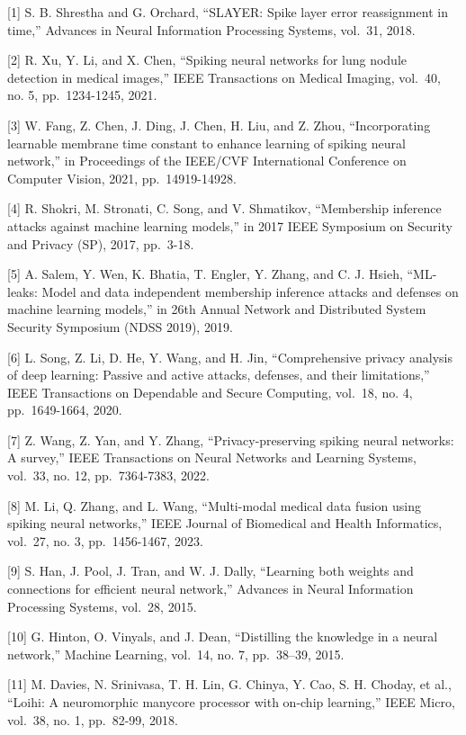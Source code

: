 \documentclass[
]{article}
\begin{document}
{[}1{]} S. B. Shrestha and G. Orchard, ``SLAYER: Spike layer error
reassignment in time,'' Advances in Neural Information Processing
Systems, vol.~31, 2018.

{[}2{]} R. Xu, Y. Li, and X. Chen, ``Spiking neural networks for lung
nodule detection in medical images,'' IEEE Transactions on Medical
Imaging, vol.~40, no. 5, pp.~1234-1245, 2021.

{[}3{]} W. Fang, Z. Chen, J. Ding, J. Chen, H. Liu, and Z. Zhou,
``Incorporating learnable membrane time constant to enhance learning of
spiking neural network,'' in Proceedings of the IEEE/CVF International
Conference on Computer Vision, 2021, pp.~14919-14928.

{[}4{]} R. Shokri, M. Stronati, C. Song, and V. Shmatikov, ``Membership
inference attacks against machine learning models,'' in 2017 IEEE
Symposium on Security and Privacy (SP), 2017, pp.~3-18.

{[}5{]} A. Salem, Y. Wen, K. Bhatia, T. Engler, Y. Zhang, and C. J.
Hsieh, ``ML-leaks: Model and data independent membership inference
attacks and defenses on machine learning models,'' in 26th Annual
Network and Distributed System Security Symposium (NDSS 2019), 2019.

{[}6{]} L. Song, Z. Li, D. He, Y. Wang, and H. Jin, ``Comprehensive
privacy analysis of deep learning: Passive and active attacks, defenses,
and their limitations,'' IEEE Transactions on Dependable and Secure
Computing, vol.~18, no. 4, pp.~1649-1664, 2020.

{[}7{]} Z. Wang, Z. Yan, and Y. Zhang, ``Privacy-preserving spiking
neural networks: A survey,'' IEEE Transactions on Neural Networks and
Learning Systems, vol.~33, no. 12, pp.~7364-7383, 2022.

{[}8{]} M. Li, Q. Zhang, and L. Wang, ``Multi-modal medical data fusion
using spiking neural networks,'' IEEE Journal of Biomedical and Health
Informatics, vol.~27, no. 3, pp.~1456-1467, 2023.

{[}9{]} S. Han, J. Pool, J. Tran, and W. J. Dally, ``Learning both
weights and connections for efficient neural network,'' Advances in
Neural Information Processing Systems, vol.~28, 2015.

{[}10{]} G. Hinton, O. Vinyals, and J. Dean, ``Distilling the knowledge
in a neural network,'' Machine Learning, vol.~14, no. 7, pp.~38--39,
2015.

{[}11{]} M. Davies, N. Srinivasa, T. H. Lin, G. Chinya, Y. Cao, S. H.
Choday, et al., ``Loihi: A neuromorphic manycore processor with on-chip
learning,'' IEEE Micro, vol.~38, no. 1, pp.~82-99, 2018.
\end{document}
